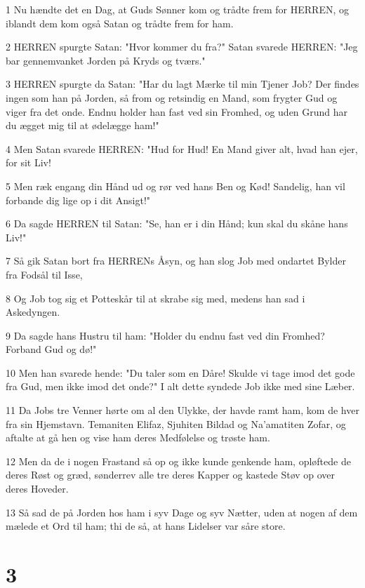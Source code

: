 \par 1 Nu hændte det en Dag, at Guds Sønner kom og trådte frem for HERREN, og iblandt dem kom også Satan og trådte frem for ham.
\par 2 HERREN spurgte Satan: "Hvor kommer du fra?" Satan svarede HERREN: "Jeg bar gennemvanket Jorden på Kryds og tværs."
\par 3 HERREN spurgte da Satan: "Har du lagt Mærke til min Tjener Job? Der findes ingen som han på Jorden, så from og retsindig en Mand, som frygter Gud og viger fra det onde. Endnu holder han fast ved sin Fromhed, og uden Grund har du ægget mig til at ødelægge ham!"
\par 4 Men Satan svarede HERREN: "Hud for Hud! En Mand giver alt, hvad han ejer, for sit Liv!
\par 5 Men ræk engang din Hånd ud og rør ved hans Ben og Kød! Sandelig, han vil forbande dig lige op i dit Ansigt!"
\par 6 Da sagde HERREN til Satan: "Se, han er i din Hånd; kun skal du skåne hans Liv!"
\par 7 Så gik Satan bort fra HERRENs Åsyn, og han slog Job med ondartet Bylder fra Fodsål til Isse,
\par 8 Og Job tog sig et Potteskår til at skrabe sig med, medens han sad i Askedyngen.
\par 9 Da sagde hans Hustru til ham: "Holder du endnu fast ved din Fromhed? Forband Gud og dø!"
\par 10 Men han svarede hende: "Du taler som en Dåre! Skulde vi tage imod det gode fra Gud, men ikke imod det onde?" I alt dette syndede Job ikke med sine Læber.
\par 11 Da Jobs tre Venner hørte om al den Ulykke, der havde ramt ham, kom de hver fra sin Hjemstavn. Temaniten Elifaz, Sjuhiten Bildad og Na'amatiten Zofar, og aftalte at gå hen og vise ham deres Medfølelse og trøste ham.
\par 12 Men da de i nogen Frastand så op og ikke kunde genkende ham, opløftede de deres Røst og græd, sønderrev alle tre deres Kapper og kastede Støv op over deres Hoveder.
\par 13 Så sad de på Jorden hos ham i syv Dage og syv Nætter, uden at nogen af dem mælede et Ord til ham; thi de så, at hans Lidelser var såre store.

\chapter{3}

